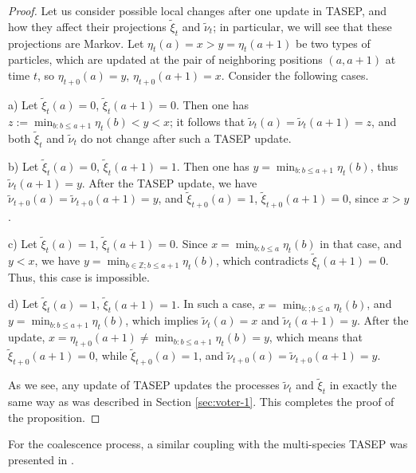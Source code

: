 \documentclass[11pt,reqno]{amsart}
\theoremstyle{definition}
\theoremstyle{remark}
\theoremstyle{remark}
\def\leq{\leqslant}
\renewcommand\le{\leq}
\def\Z{\mathbb Z}
\numberwithin{equation}{section}
\begin{document}
	\begin{proof}
		Let us consider possible local changes after one update in TASEP, and how they affect their projections $\tilde \xi_t$ and $\tilde \nu_t$; in particular, we will see that these projections are Markov. Let $\eta_t (a)=x > y=\eta_t (a+1)$ be two types of particles, which are updated at the pair of neighboring positions $(a,a+1)$ at time $t$, so $\eta_{t+0} (a) = y$, $\eta_{t+0} (a+1) = x$. Consider the following cases.
		
		\medskip
		
		a) Let $\tilde \xi_t (a) = 0$, $\tilde \xi_t (a+1)=0$. Then one has $z:=\min_{b: b \le a+1} \eta_t (b) < y < x$; it follows that $\tilde \nu_t (a) = \tilde \nu_t (a+1) = z$, and both $\tilde \xi_t$ and $\tilde \nu_t$ do not change after such a TASEP update. 
		
		\medskip
		
		b) Let $\tilde \xi_t (a) = 0$, $\tilde \xi_t (a+1)=1$. Then one has $y=\min_{b: b \le a+1} \eta_t (b)$, thus $\tilde \nu_t (a+1)=y$. After the TASEP update, we have $\tilde \nu_{t+0} (a) = 
		\tilde \nu_{t+0} (a+1)=y$, and $\tilde \xi_{t+0} (a) = 1$, $\tilde \xi_{t+0} (a+1)=0$, since $x>y$.
		
		\medskip
		
		c) Let $\tilde \xi_t (a) = 1$, $\tilde \xi_t (a+1)=0$. Since $x=\min_{b: b \le a} \eta_t (b)$ in that case, and $y<x$, we have $y=\min_{b \in \Z; b \le a+1} \eta_t (b)$, which contradicts $\tilde \xi_t (a+1)=0$. Thus, this case is impossible. 
		
		\medskip
		
		d) Let $\tilde \xi_t (a) = 1$, $\tilde \xi_t (a+1)=1$. In such a case, $x=\min_{b:; b \le a} \eta_t (b)$, and $y=\min_{b: b \le a+1} \eta_t (b)$, which implies $\tilde \nu_t (a)=x$ and $\tilde \nu_t (a+1)=y$. After the update, $x = \eta_{t+0}  (a+1) \ne \min_{b: b \le a+1} \eta_t (b)=y$, which means that $\tilde \xi_{t+0} (a+1) = 0$, while $\tilde \xi_{t+0} (a)=1$, and $\tilde \nu_{t+0} (a) = \tilde \nu_{t+0} (a+1) = y$. 
		
		\medskip
		
		As we see, any update of TASEP updates the processes $\tilde \nu_t$ and $\tilde \xi_t$ in exactly the same way as was described in Section \ref{sec:voter-1}. This completes the proof of the proposition.  
	\end{proof}
	
	For the coalescence process, a similar coupling with the multi-species TASEP was presented in \cite{K}. 
	
\end{document}
